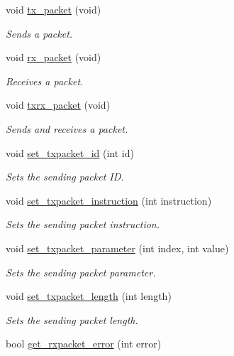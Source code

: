 \begin{DoxyCompactItemize}
void \hyperlink{classdynamixel_a479187cd8940c16dd4374eb5be22b888}{tx\+\_\+packet} (void)
\begin{DoxyCompactList}\small\item\em Sends a packet. \end{DoxyCompactList}\item 
void \hyperlink{classdynamixel_aa26d2d2dff768563a1cb1480aa061608}{rx\+\_\+packet} (void)
\begin{DoxyCompactList}\small\item\em Receives a packet. \end{DoxyCompactList}\item 
void \hyperlink{classdynamixel_aebfc569c6b1eb0b98f8c385f0f921fc0}{txrx\+\_\+packet} (void)
\begin{DoxyCompactList}\small\item\em Sends and receives a packet. \end{DoxyCompactList}\item 
void \hyperlink{classdynamixel_a84e24c72c3e5be866f8b28c2e5bd1d95}{set\+\_\+txpacket\+\_\+id} (int id)
\begin{DoxyCompactList}\small\item\em Sets the sending packet I\+D. \end{DoxyCompactList}\item 
void \hyperlink{classdynamixel_a209a43f983f214323b6f0a627d5e8c13}{set\+\_\+txpacket\+\_\+instruction} (int instruction)
\begin{DoxyCompactList}\small\item\em Sets the sending packet instruction. \end{DoxyCompactList}\item 
void \hyperlink{classdynamixel_a2c3d31bbbed70a69918e9972a620384b}{set\+\_\+txpacket\+\_\+parameter} (int index, int value)
\begin{DoxyCompactList}\small\item\em Sets the sending packet parameter. \end{DoxyCompactList}\item 
void \hyperlink{classdynamixel_a829278f48e21c810b172eb8cab3b86de}{set\+\_\+txpacket\+\_\+length} (int length)
\begin{DoxyCompactList}\small\item\em Sets the sending packet length. \end{DoxyCompactList}\item 
bool \hyperlink{classdynamixel_a843b0aac721e4264e7e3097f80980243}{get\+\_\+rxpacket\+\_\+error} (int error)

\end{DoxyCompactItemize}
